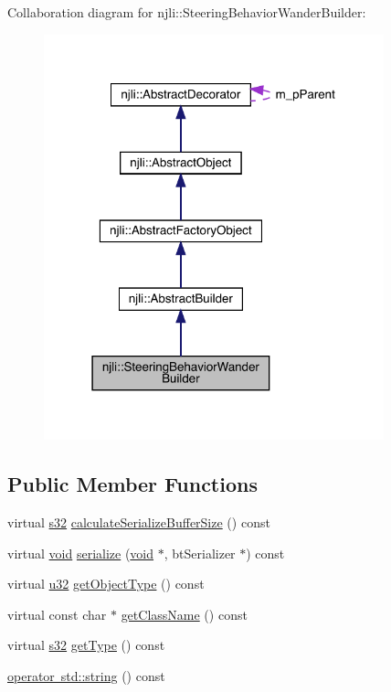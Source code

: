 Collaboration diagram for njli\+:\+:Steering\+Behavior\+Wander\+Builder\+:\nopagebreak
\begin{figure}[H]
\begin{center}
\leavevmode
\includegraphics[width=279pt]{classnjli_1_1_steering_behavior_wander_builder__coll__graph}
\end{center}
\end{figure}
\subsection*{Public Member Functions}
\begin{DoxyCompactItemize}
\item 
virtual \mbox{\hyperlink{_util_8h_aa62c75d314a0d1f37f79c4b73b2292e2}{s32}} \mbox{\hyperlink{classnjli_1_1_steering_behavior_wander_builder_ac535056b1648203c76b788c9c1e7bea3}{calculate\+Serialize\+Buffer\+Size}} () const
\item 
virtual \mbox{\hyperlink{_thread_8h_af1e856da2e658414cb2456cb6f7ebc66}{void}} \mbox{\hyperlink{classnjli_1_1_steering_behavior_wander_builder_ae0ffb4d9dc1e7d4aea3113ec3cf5df4c}{serialize}} (\mbox{\hyperlink{_thread_8h_af1e856da2e658414cb2456cb6f7ebc66}{void}} $\ast$, bt\+Serializer $\ast$) const
\item 
virtual \mbox{\hyperlink{_util_8h_a10e94b422ef0c20dcdec20d31a1f5049}{u32}} \mbox{\hyperlink{classnjli_1_1_steering_behavior_wander_builder_aa814427a170e48aea2a8876a2882e6eb}{get\+Object\+Type}} () const
\item 
virtual const char $\ast$ \mbox{\hyperlink{classnjli_1_1_steering_behavior_wander_builder_aca98c095d79ec38cec510f9e5082ebd5}{get\+Class\+Name}} () const
\item 
virtual \mbox{\hyperlink{_util_8h_aa62c75d314a0d1f37f79c4b73b2292e2}{s32}} \mbox{\hyperlink{classnjli_1_1_steering_behavior_wander_builder_a639444775e61a75036b1ae87af84d049}{get\+Type}} () const
\item 
\mbox{\hyperlink{classnjli_1_1_steering_behavior_wander_builder_a5f4adf5a0b8133134bc8b6b23f1d33b4}{operator std\+::string}} () const
\end{DoxyCompactItemize}
